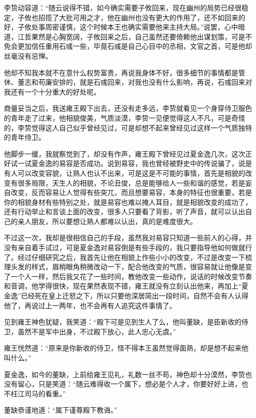 李贽动容道：“随云说得不错，如今确实需要子攸回来，现在幽州的局势已经很稳定，子攸也招揽了大批可用之才，他在幽州也没有更大的作用了，还不如回来的好，子攸处事周密谨慎，这个时候本王也确实需要他来主持大局。”说罢，心中暗道，江哲果然是心胸宽阔，子攸回来之后，自己虽然还要倚赖他出谋划策，可是不免会更加信任重用石彧一些，毕竟石彧是自己心目中的丞相，文官之首，可是他却丝毫没有忌惮。

他却不知我本就不在意什么权势富贵，再说我身体不好，很多细节的事情都是管休、董志和苟廉安排的，就是石彧回来，对我也没有什么影响，再说，石彧回来对我还有一个十分重大的好处呢。

商量妥当之后，我送雍王殿下出去，还没有走多远，李贽就看见一个身穿侍卫服色的青年走了过来，他相貌俊美，气质淡漠，李贽一见便觉得这人不凡，可是奇怪的，李贽觉得这人自己似乎曾经见过，可是却想不起来曾经见过这样一个气质独特的青年侍卫。

他脚步一缓，我就察觉到了，却没有作声，雍王殿下曾经见过夏金逸几次，这次正好试一试夏金逸的易容是否成功。说到易容，我也曾经被野史中的传说骗了，说是有人可以改变容貌，让熟人也认不出来，可是这是不可能的事情，首先是相貌的改变有很多局限，天生人的相貌，不论丑俊，总是能够给人一些和谐的感觉，若是妄自改变，反而容易让人觉得有些突兀，而且想要易容，本身的特征也很重要，若是你的相貌身材有些特别之处，就是易容也难以掩人耳目，就是相貌改变的成功了，还有行动举止和言谈上面的改变，很多人只要看了背影，听了声音，就可以认出自己的亲人朋友，所以要想让熟人都难以认出，真的是难度很大。

不过这一次，我却是很相信自己的手段，虽然我对易容只知道一些前人的心得，并没有亲自着手试过，可是夏金逸对易容倒是有些手段的，我只要指导他如何做就行了。经过仔细研究之后，我首先让他在相貌上作些小小的改变，不过是改变一下梳理头发的样式，眉梢眼角稍微改动一下，配合他改变的气质，很容易就让他像是变了一个人一样，然后我又花了一些时间，教他改变一些动作，说话的时候改变节奏和音调，他学得很快，现在果然表现不错，雍王就没有立刻认出他来，再加上“夏金逸”已经死在皇上迁怒之下，所以只要他深居简出一段时间，自然不会有人认得他了，再说过上一两年，也不会再有人追究这件事情了。

见到雍王神色犹疑，我笑道：“殿下可是见到生人了么，他叫董缺，是臣新收的侍卫，虽然不是军中出身，不过殿下放心，此人忠心无虞。”

雍王恍然道：“原来是你新收的侍卫，怪不得本王虽然觉得面熟，却是想不起来他叫什么。”

夏金逸，如今的董缺，上前给雍王见礼，礼数一丝不苟，神色却十分漠然，李贽也没有留心，只是笑道：“随云难得收一个属下，想必是个人才，你要好好上进，也不枉江司马的看重。”

董缺恭谨地道：“属下谨尊殿下教诲。”

